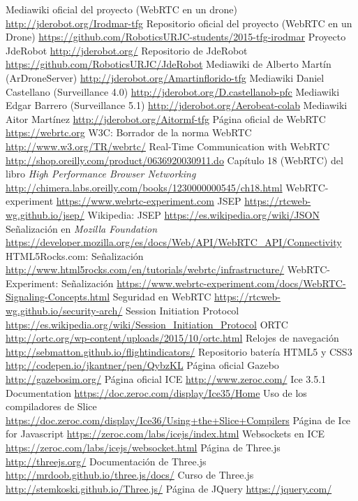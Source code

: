 \documentclass[oneside,a4paper,12pt]{book}
\begin{document}
\begin{thebibliography}{}

 Mediawiki oficial del proyecto (WebRTC en un drone) \url{http://jderobot.org/Irodmar-tfg}
 Repositorio oficial del proyecto (WebRTC en un Drone) \url{https://github.com/RoboticsURJC-students/2015-tfg-irodmar} 
 Proyecto JdeRobot \url{http://jderobot.org/} 
 Repositorio de JdeRobot \url{https://github.com/RoboticsURJC/JdeRobot} 
 Mediawiki de Alberto Martín (ArDroneServer) \url{http://jderobot.org/Amartinflorido-tfg}
 Mediawiki Daniel Castellano (Surveillance 4.0) \url{http://jderobot.org/D.castellanob-pfc} 
 Mediawiki Edgar Barrero (Surveillance 5.1) \url{http://jderobot.org/Aerobeat-colab}
 Mediawiki Aitor Martínez \url{http://jderobot.org/Aitormf-tfg}
 Página oficial de WebRTC \url{https://webrtc.org}
 W3C: Borrador de la norma WebRTC \url{http://www.w3.org/TR/webrtc/}
 Real-Time Communication with WebRTC \url{http://shop.oreilly.com/product/0636920030911.do}
 Capítulo 18 (WebRTC) del libro \emph{High Performance Browser Networking} \url{http://chimera.labs.oreilly.com/books/1230000000545/ch18.html}
 WebRTC-experiment \url{https://www.webrtc-experiment.com}
 JSEP  \url{https://rtcweb-wg.github.io/jsep/}
 Wikipedia: JSEP  \url{https://es.wikipedia.org/wiki/JSON}
 Señalización en \emph{Mozilla Foundation} \url{https://developer.mozilla.org/es/docs/Web/API/WebRTC_API/Connectivity}
 HTML5Rocks.com: Señalización \url{http://www.html5rocks.com/en/tutorials/webrtc/infrastructure/}
 WebRTC-Experiment: Señalización \url{https://www.webrtc-experiment.com/docs/WebRTC-Signaling-Concepts.html}
 Seguridad en WebRTC \url{https://rtcweb-wg.github.io/security-arch/}
 Session Initiation Protocol \url{https://es.wikipedia.org/wiki/Session_Initiation_Protocol}
 ORTC \url{http://ortc.org/wp-content/uploads/2015/10/ortc.html}
 Relojes de navegación \url{http://sebmatton.github.io/flightindicators/}
 Repositorio batería HTML5 y CSS3 \url{http://codepen.io/jkantner/pen/QybzKL}
 Página oficial Gazebo \url{http://gazebosim.org/}
 Página oficial ICE  \url{http://www.zeroc.com/}
Ice 3.5.1 Documentation  \url{https://doc.zeroc.com/display/Ice35/Home}
 Uso de los compiladores de Slice \url{https://doc.zeroc.com/display/Ice36/Using+the+Slice+Compilers}
 Página de Ice for Javascript  \url{https://zeroc.com/labs/icejs/index.html}
 Websockets en ICE \url{https://zeroc.com/labs/icejs/websocket.html}
 Página de Three.js \url{http://threejs.org/}
 Documentación de Three.js \url{http://mrdoob.github.io/three.js/docs/}
 Curso de Three.js \url{http://stemkoski.github.io/Three.js/}
 Página de JQuery \url{https://jquery.com/}

\end{thebibliography} 




\end{document}
